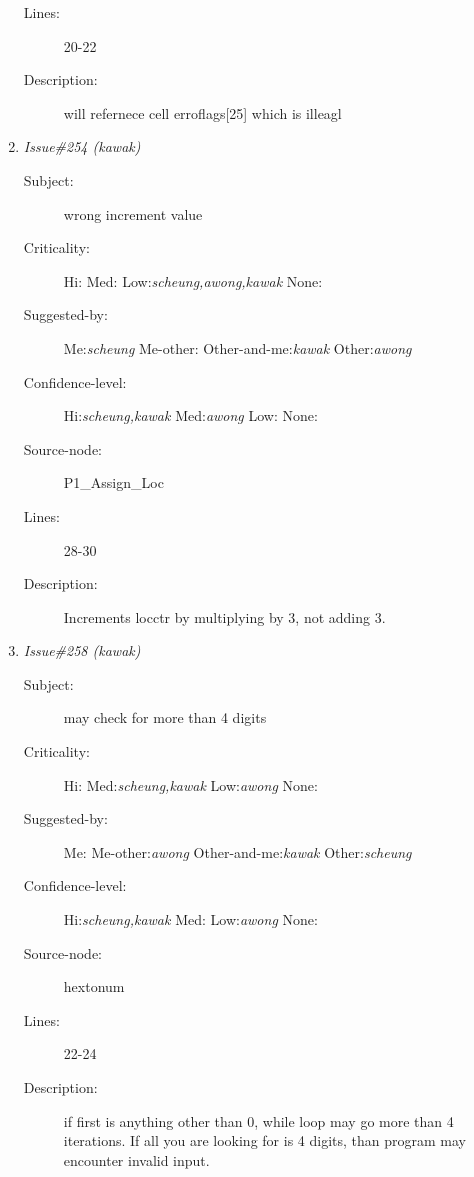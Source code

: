 \begin{enumerate}
\begin{description}
\item [Lines:] 20-22

\item [Description:] will refernece cell erroflags[25] which is illeagl
\end{description}
\item {\it Issue\#254 (kawak)}
\begin{description}
\item [Subject:] wrong increment value
\item [Criticality:] Hi:{\it } Med:{\it } Low:{\it scheung,awong,kawak} None:{\it }
\item [Suggested-by:] Me:{\it scheung} Me-other:{\it } Other-and-me:{\it kawak} Other:{\it awong}
\item [Confidence-level:] Hi:{\it scheung,kawak} Med:{\it awong} Low:{\it } None:{\it }
\item [Source-node:] P1\_Assign\_Loc

\item [Lines:] 28-30

\item [Description:] Increments locctr by multiplying by 3, not adding 3.
\end{description}
\item {\it Issue\#258 (kawak)}
\begin{description}
\item [Subject:] may check for more than 4 digits
\item [Criticality:] Hi:{\it } Med:{\it scheung,kawak} Low:{\it awong} None:{\it }
\item [Suggested-by:] Me:{\it } Me-other:{\it awong} Other-and-me:{\it kawak} Other:{\it scheung}
\item [Confidence-level:] Hi:{\it scheung,kawak} Med:{\it } Low:{\it awong} None:{\it }
\item [Source-node:] hextonum

\item [Lines:] 22-24

\item [Description:] if first is anything other than 0, while loop may go more than 4 iterations.
If all you are looking for is 4 digits, than program may encounter invalid
input.
\end{description}
\end{enumerate}
